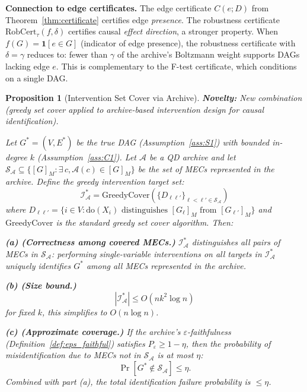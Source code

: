 \documentclass{article}
\theoremstyle{definition}
\theoremstyle{plain}
\newtheorem{proposition}{Proposition}
\theoremstyle{remark}
\begin{document}
\textbf{Connection to edge certificates.} The edge certificate $C(e; D)$ from
Theorem~\ref{thm:certificate} certifies edge \emph{presence}. The robustness certificate
$\mathrm{RobCert}_\tau(f, \delta)$ certifies causal \emph{effect direction}, a stronger
property. When $f(G) = \mathbf{1}[e \in G]$ (indicator of edge presence), the robustness
certificate with $\delta = \gamma$ reduces to: fewer than $\gamma$ of the archive's
Boltzmann weight supports DAGs lacking edge $e$. This is complementary to the F-test
certificate, which conditions on a single DAG.

\begin{proposition}[Intervention Set Cover via Archive]
\label{prop:intervention_cover}
\textbf{Novelty:} New combination (greedy set cover applied to archive-based intervention
design for causal identification).

Let $G^* = (V, E^*)$ be the true DAG (Assumption~\ref{ass:S1}) with bounded in-degree $k$
(Assumption~\ref{ass:C1}). Let $\mathcal{A}$ be a QD archive and let
$\mathcal{S}_\mathcal{A} \subseteq \{[G]_M : \exists\, c, \mathcal{A}(c) \in [G]_M\}$
be the set of MECs represented in the archive. Define the greedy intervention target set:
\begin{equation}
  \mathcal{I}^*_{\mathcal{A}} = \mathrm{GreedyCover}\!\left(
  \{D_{\ell\ell'}\}_{\ell < \ell' \in \mathcal{S}_\mathcal{A}}\right)
\end{equation}
where $D_{\ell\ell'} = \{i \in V : \mathrm{do}(X_i) \text{ distinguishes } [G_\ell]_M
\text{ from } [G_{\ell'}]_M\}$ and $\mathrm{GreedyCover}$ is the standard greedy set
cover algorithm. Then:

\textbf{(a) (Correctness among covered MECs.)} $\mathcal{I}^*_{\mathcal{A}}$ distinguishes
all pairs of MECs in $\mathcal{S}_\mathcal{A}$: performing single-variable interventions on
all targets in $\mathcal{I}^*_{\mathcal{A}}$ uniquely identifies $G^*$ among all MECs
\emph{represented in the archive}.

\textbf{(b) (Size bound.)}
\begin{equation}
  |\mathcal{I}^*_{\mathcal{A}}| \leq O(nk^2 \log n)
\end{equation}
for fixed $k$, this simplifies to $O(n \log n)$.

\textbf{(c) (Approximate coverage.)} If the archive's $\varepsilon$-faithfulness
(Definition~\ref{def:eps_faithful}) satisfies $P_\varepsilon \geq 1 - \eta$, then
the probability of misidentification due to MECs not in $\mathcal{S}_\mathcal{A}$ is
at most $\eta$:
\begin{equation}
  \Pr[G^* \notin \mathcal{S}_\mathcal{A}] \leq \eta.
\end{equation}
Combined with part (a), the total identification failure probability is $\leq \eta$.
\end{proposition}
\end{document}
